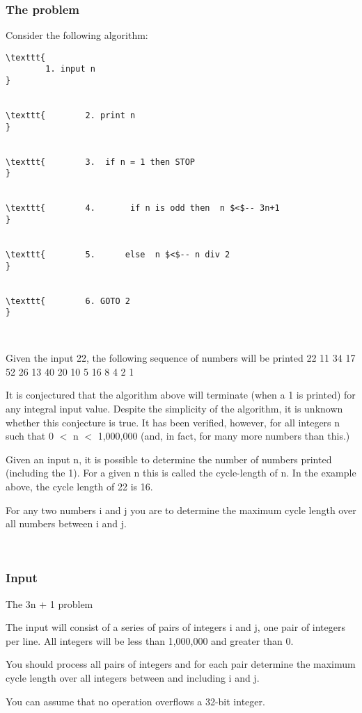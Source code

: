 

\subsubsection{The problem}

Consider the following algorithm:
\begin{verbatim}
\texttt{
		1. input n
}


\texttt{		2. print n
}


\texttt{		3. 	if n = 1 then STOP
}


\texttt{		4. 	     if n is odd then  n $<$-- 3n+1 
}


\texttt{		5. 		else  n $<$-- n div 2 
}


\texttt{		6. GOTO 2
}

 \end{verbatim}

Given the input 22, the following sequence of numbers will be printed 22 11  34 17 52 26 13 40 20 10 5 16 8 4 2 1

It is conjectured that the algorithm above will terminate (when a 1 is printed) for any integral input value. Despite the simplicity of the algorithm, it is unknown whether this conjecture is true. It has been verified, however, for all integers n such that 0 $<$ n $<$ 1,000,000 (and, in  fact, for many more numbers than this.)

Given an input n, it is possible to determine the number of numbers  printed (including the 1). For a given n this is called the  cycle-length of n. In the example above, the cycle length of 22  is 16.

For any two numbers i and j you are to determine the maximum  cycle length over all numbers between i and j. 

 

\subsubsection{Input}

The 3n + 1 problem

The input will consist of a series of pairs of integers i and  j, one pair of integers per line. All integers will be less than  1,000,000 and greater than 0.

You should process all pairs of integers and for each pair determine the maximum cycle length over all integers between and including i and  j.

You can assume that no operation overflows a 32-bit integer.


